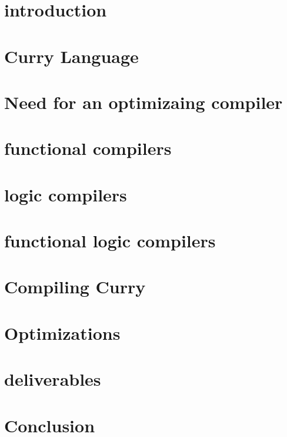 \documentclass{article}
\begin{document}
\begin{abstract}
    
\end{abstract}

\section{introduction}


\section{Curry Language}


\section{Need for an optimizaing compiler}


\section{functional compilers}


\section{logic compilers}


\section{functional logic compilers}


\section{Compiling Curry}


\section{Optimizations}


\section{deliverables}


\section{Conclusion}





\end{document}

